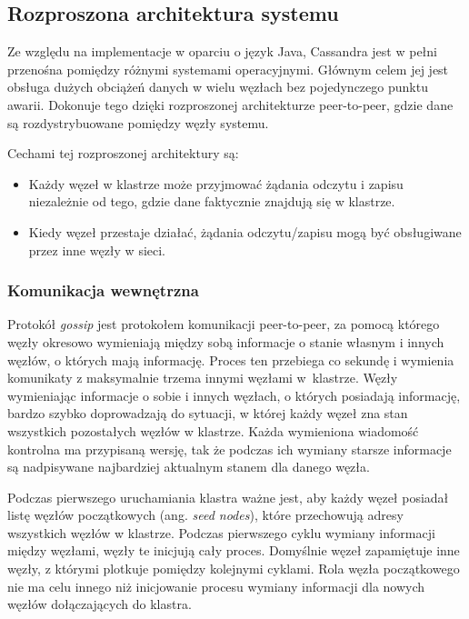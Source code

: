 \subsection{Rozproszona architektura systemu}

Ze względu na implementacje w oparciu o język Java, Cassandra jest w pełni przenośna pomiędzy różnymi systemami operacyjnymi. 
Głównym celem jej jest obsługa dużych obciążeń danych w wielu węzłach bez pojedynczego punktu awarii.
Dokonuje tego dzięki rozproszonej architekturze peer-to-peer, gdzie dane są rozdystrybuowane pomiędzy węzły systemu.

Cechami tej rozproszonej architektury są:
\begin{itemize}
    \item Każdy węzeł w klastrze może przyjmować żądania odczytu i zapisu niezależnie od tego, gdzie dane faktycznie znajdują się w klastrze.
    \item Kiedy węzeł przestaje działać, żądania odczytu/zapisu mogą być obsługiwane przez inne węzły w sieci.
\end{itemize}

\subsubsection{Komunikacja wewnętrzna}

Protokół \textit{gossip} \cite{cassandraGossipProtocol} jest protokołem komunikacji peer-to-peer, za pomocą którego węzły okresowo wymieniają między sobą informacje o stanie własnym i innych węzłów, o których mają informację. 
Proces ten przebiega co sekundę i wymienia komunikaty z maksymalnie trzema innymi węzłami w~klastrze.
Węzły wymieniając informacje o sobie i innych węzłach, o których posiadają informację, bardzo szybko doprowadzają do sytuacji, w której każdy węzeł zna stan wszystkich pozostałych węzłów w klastrze.
Każda wymieniona wiadomość kontrolna ma przypisaną wersję, tak że podczas ich wymiany starsze informacje są nadpisywane najbardziej aktualnym stanem dla danego węzła. 

Podczas pierwszego uruchamiania klastra ważne jest, aby każdy węzeł posiadał listę węzłów początkowych (ang. \textit{seed nodes}), które przechowują adresy wszystkich węzłów w klastrze.
Podczas pierwszego cyklu wymiany informacji między węzłami, węzły te inicjują cały proces.
Domyślnie węzeł zapamiętuje inne węzły, z którymi plotkuje pomiędzy kolejnymi cyklami.
Rola węzła początkowego nie ma celu innego niż inicjowanie procesu wymiany informacji dla nowych węzłów dołączających do klastra.


